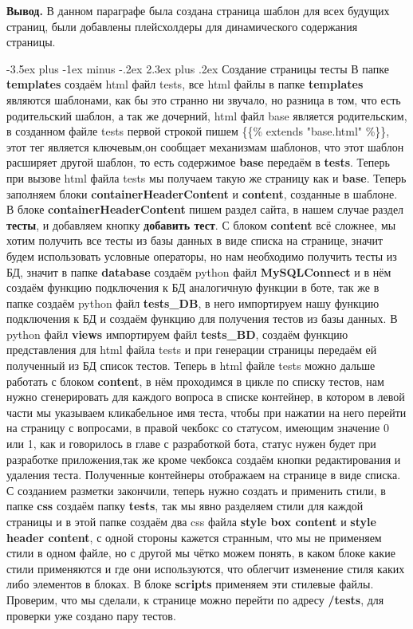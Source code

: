 \documentclass[12pt, oldlfont, amsfonts]{report}
\makeatletter
\renewcommand{\section}{\@startsection{section}{1}{0pt}%
                                {-3.5ex plus -1ex minus -.2ex}%
                                {2.3ex plus .2ex}%
{\centering\hyphenpenalty=10000\normalfont\Large\bfseries}}
\makeatother
\begin{document}
{\bf Вывод.} В данном параграфе была создана страница шаблон для всех будущих страниц, были добавлены плейсхолдеры для динамического содержания страницы.

\section{Создание страницы тесты}
В папке {\bf templates} создаём html файл {tests}, все html файлы в папке {\bf templates} являются шаблонами, как бы это странно ни звучало, но разница в том, что есть родительский шаблон, а так же дочерний, html файл {base} является родительским, в созданном файле {tests} первой строкой пишем \{\{\% extends "base.html" \%\}\}, этот тег является ключевым,он сообщает механизмам шаблонов, что этот шаблон расширяет другой шаблон, то есть содержимое {\bf base} передаём в {\bf tests}. Теперь при вызове html файла {tests} мы получаем такую же страницу как и {\bf base}. Теперь заполняем блоки {\bf containerHeaderContent} и {\bf content}, созданные в шаблоне. В блоке {\bf containerHeaderContent} пишем раздел сайта, в нашем случае раздел {\bf тесты}, и добавляем кнопку {\bf добавить тест}. С блоком {\bf content} всё сложнее, мы хотим получить все тесты из базы данных в виде списка на странице, значит будем использовать условные операторы, но нам необходимо получить тесты из БД, значит в папке {\bf database} создаём python файл {\bf MySQLConnect} и в нём создаём функцию подключения к БД аналогичную функции в боте, так же в папке создаём python файл {\bf tests\_DB}, в него импортируем нашу функцию подключения к БД и создаём функцию для получения тестов из базы данных. В python файл {\bf views} импортируем файл {\bf tests\_BD}, создаём функцию представления для html файла tests и при генерации страницы передаём ей полученный из БД список тестов. Теперь в html файле {tests} можно дальше работать с блоком {\bf content}, в нём проходимся в цикле по списку тестов, нам нужно сгенерировать для каждого вопроса в списке контейнер, в котором в левой части мы указываем кликабельное имя теста, чтобы при нажатии на него перейти на страницу с вопросами, в правой чекбокс со статусом, имеющим значение 0 или 1, как и говорилось в главе с разработкой бота, статус нужен будет при разработке приложения,так же кроме чекбокса создаём кнопки редактирования и удаления теста. Полученные контейнеры отображаем на странице в виде списка. С созданием разметки закончили, теперь нужно создать и применить стили, в папке {\bf css} создаём папку {\bf tests}, так мы явно разделяем стили для каждой страницы и в этой папке создаём два css файла {\bf style box content} и {\bf style header content}, с одной стороны кажется странным, что мы не применяем стили в одном файле, но с другой мы чётко можем понять, в каком блоке какие стили применяются и где они используются, что облегчит изменение стиля каких либо элементов в блоках. В блоке {\bf scripts} применяем эти стилевые файлы. Проверим, что мы сделали, к странице можно перейти по адресу {\bf /tests}, для проверки уже создано пару тестов.
\end{document}
